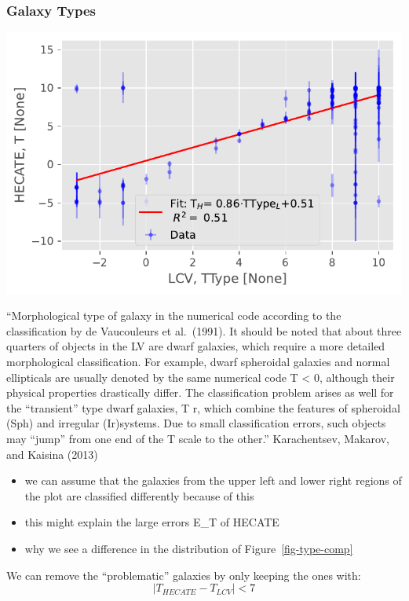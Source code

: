 \documentclass[
]{article}
\providecommand{\tightlist}{%
  \setlength{\itemsep}{0pt}\setlength{\parskip}{0pt}}\usepackage{longtable,booktabs,array}
\begin{document}
\subsubsection{Galaxy Types}

\includegraphics{compare_files/figure-pdf/cell-22-output-1.pdf}

``Morphological type of galaxy in the numerical code according to the
classification by de Vaucouleurs et al.~(1991). It should be noted that
about three quarters of objects in the LV are dwarf galaxies, which
require a more detailed morphological classification. For example, dwarf
spheroidal galaxies and normal ellipticals are usually denoted by the
same numerical code T \textless{} 0, although their physical properties
drastically differ. The classification problem arises as well for the
``transient'' type dwarf galaxies, T r, which combine the features of
spheroidal (Sph) and irregular (Ir)systems. Due to small classification
errors, such objects may ``jump'' from one end of the T scale to the
other.'' Karachentsev, Makarov, and Kaisina (2013)

\begin{itemize}
\tightlist
\item
  we can assume that the galaxies from the upper left and lower right
  regions of the plot are classified differently because of this
\item
  this might explain the large errors E\_T of HECATE
\item
  why we see a difference in the distribution of
  Figure~\ref{fig-type-comp}
\end{itemize}

We can remove the ``problematic'' galaxies by only keeping the ones
with: \[
|{T_{HECATE}-T_{LCV}}|<7
\]
\end{document}
